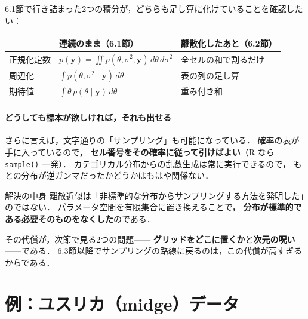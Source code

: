 \documentclass[lualatex,ja=standard,a4paper,12pt]{bxjsarticle}
\begin{document}
\noindent 6.1節で行き詰まった2つの積分が，どちらも足し算に化けていることを確認したい：

\begin{center}
\renewcommand{\arraystretch}{1.8}
\begin{tabular}{lll}
\toprule
 & 連続のまま（6.1節） & 離散化したあと（6.2節） \\
\midrule
正規化定数 & $p(\boldsymbol{y}) = \iint p(\theta,\sigma^2,\boldsymbol{y})\,d\theta\,d\sigma^2$
  & 全セルの和で割るだけ \\
周辺化 & $\int p(\theta, \sigma^2 \mid \boldsymbol{y})\,d\theta$
  & 表の列の足し算 \\
期待値 & $\int \theta\, p(\theta \mid \boldsymbol{y})\,d\theta$
  & 重み付き和 \\
\bottomrule
\end{tabular}
\end{center}

\paragraph{どうしても標本が欲しければ，それも出せる}
さらに言えば，文字通りの「サンプリング」も可能になっている．
確率の表が手に入っているので，
\textbf{セル番号をその確率に従って引けばよい}（R なら \texttt{sample()} 一発）．
カテゴリカル分布からの乱数生成は常に実行できるので，
もとの分布が逆ガンマだったかどうかはもはや関係ない．

\begin{thmbox}{解決の中身}
離散近似は「非標準的な分布からサンプリングする方法を発明した」のではない．
パラメータ空間を有限集合に置き換えることで，
\textbf{分布が標準的である必要そのものをなくした}のである．

\medskip
その代償が，次節で見る2つの問題——
\textbf{グリッドをどこに置くか}と\textbf{次元の呪い}——である．
6.3節以降でサンプリングの路線に戻るのは，この代償が高すぎるからである．
\end{thmbox}

\section{例：ユスリカ（midge）データ}
\end{document}
